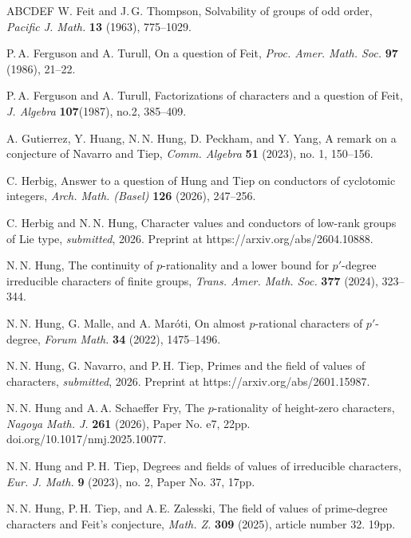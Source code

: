 \documentclass[12pt]{amsart}
\theoremstyle{definition}
\numberwithin{equation}{section}
\begin{document}
\begin{thebibliography}{ABCDEF}
{\sc W. Feit and J.\,G. Thompson}, Solvability of groups of odd
order, \emph{Pacific J. Math.} \textbf{13} (1963), 775--1029.

{\sc P.\,A. Ferguson and A. Turull}, On a question of Feit,
\emph{Proc. Amer. Math. Soc.} \textbf{97} (1986), 21--22.

{\sc P.\,A. Ferguson and A. Turull}, Factorizations of characters
and a question of Feit, \emph{J. Algebra} \textbf{107}(1987), no.2,
385--409.

{\sc A. Gutierrez, Y. Huang, N.\,N. Hung, D. Peckham, and Y. Yang},
A remark on a conjecture of Navarro and Tiep, \emph{Comm. Algebra}
\textbf{51} (2023), no. 1, 150--156.

{\sc C. Herbig}, Answer to a question of Hung and Tiep on conductors
of cyclotomic integers, \emph{Arch. Math. (Basel)} \textbf{126}
(2026), 247--256.

{\sc C. Herbig and N.\,N. Hung}, Character values and conductors of
low-rank groups of Lie type, \emph{submitted}, 2026. Preprint at
https://arxiv.org/abs/2604.10888.

{\sc N.\,N. Hung}, The continuity of $p$-rationality and a lower
bound for $p'$-degree irreducible characters of finite groups,
\emph{Trans. Amer. Math. Soc.} \textbf{377} (2024), 323--344.



%
{\sc N.\,N. Hung, G. Malle, and A. Mar\'{o}ti}, On almost
$p$-rational characters of $p'$-degree, \emph{Forum Math.}
\textbf{34} (2022), 1475--1496.

{\sc N.\,N. Hung, G. Navarro, and P.\,H. Tiep}, Primes and the field
of values of characters, \emph{submitted}, 2026. Preprint at
https://arxiv.org/abs/2601.15987.

{\sc N.\,N. Hung and A.\,A. Schaeffer Fry}, The $p$-rationality of
height-zero characters, \emph{Nagoya Math. J.} \textbf{261} (2026),
Paper No. e7, 22pp. doi.org/10.1017/nmj.2025.10077.

{\sc N.\,N. Hung and P.\,H. Tiep}, Degrees and fields of values of
irreducible characters, \emph{Eur. J. Math.} \textbf{9} (2023), no.
2, Paper No. 37, 17pp.



{\sc N.\,N. Hung, P.\,H. Tiep, and A.\,E. Zalesski}, The field of
values of prime-degree characters and Feit's conjecture, \emph{Math.
Z.} \textbf{309} (2025), article number 32. 19pp.


\end{thebibliography}
\end{document}
